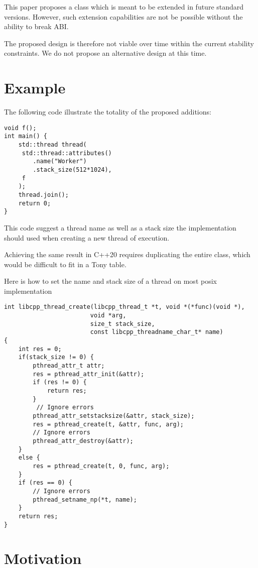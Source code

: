 \documentclass{wg21}
\begin{document}
\color{red}

This paper proposes a class  which is meant to be extended in future standard versions.
However, such extension capabilities are not be possible without the ability to break ABI.

The proposed design is therefore not viable over time within the current stability constraints.
We do not propose an alternative design at this time.


\color{black}
\section{Example}

The following code illustrate the totality of the proposed additions:

\begin{lstlisting}[style=MY]
void f();
int main() {
    std::thread thread(
     std::thread::attributes()
        .name("Worker")
        .stack_size(512*1024),
     f
    );
    thread.join();
    return 0;
}
\end{lstlisting}


This code suggest a thread name as well as a stack size 
the implementation should used when creating a new thread of execution.

Achieving the same result in C++20 requires duplicating the entire 
class, which would be difficult to fit in a Tony table.

Here is how to set the name and stack size of a thread on most posix implementation

\begin{lstlisting}[style=MYSMALL]
int libcpp_thread_create(libcpp_thread_t *t, void *(*func)(void *),
                        void *arg,
                        size_t stack_size,
                        const libcpp_threadname_char_t* name)
{
    int res = 0;
    if(stack_size != 0) {
        pthread_attr_t attr;
        res = pthread_attr_init(&attr);
        if (res != 0) {
            return res;
        }
         // Ignore errors
        pthread_attr_setstacksize(&attr, stack_size);
        res = pthread_create(t, &attr, func, arg);
        // Ignore errors
        pthread_attr_destroy(&attr);
    }
    else {
        res = pthread_create(t, 0, func, arg);
    }
    if (res == 0) {
        // Ignore errors
        pthread_setname_np(*t, name);
    }
    return res;
}
\end{lstlisting}
\section{Motivation}
\end{document}
